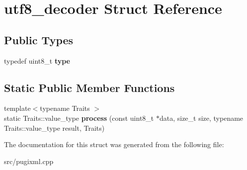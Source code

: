 \hypertarget{structutf8__decoder}{}\section{utf8\+\_\+decoder Struct Reference}
\label{structutf8__decoder}
\subsection*{Public Types}
\begin{DoxyCompactItemize}
\item 
\mbox{\label{structutf8__decoder_a83f88a84f37817f5f4aeb32a3c07b1c2}} 
typedef uint8\+\_\+t {\bfseries type}
\end{DoxyCompactItemize}
\subsection*{Static Public Member Functions}
\begin{DoxyCompactItemize}
\item 
\mbox{\label{structutf8__decoder_a542f1dede169ee2078d2f616ea03c158}} 
{\footnotesize template$<$typename Traits $>$ }\\static Traits\+::value\+\_\+type {\bfseries process} (const uint8\+\_\+t $\ast$data, size\+\_\+t size, typename Traits\+::value\+\_\+type result, Traits)
\end{DoxyCompactItemize}


The documentation for this struct was generated from the following file\+:\begin{DoxyCompactItemize}
\item 
src/pugixml.\+cpp\end{DoxyCompactItemize}
